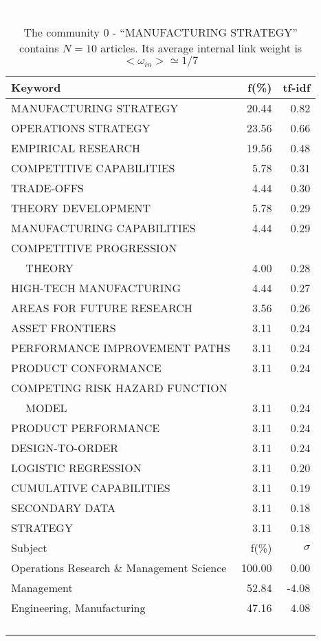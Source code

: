 \documentclass[a4paper,11pt]{report}
\begin{document}
\begin{landscape}
\begin{table}[!ht]
\caption{The community 0 - ``MANUFACTURING STRATEGY'' contains $N = 10$ articles. Its average internal link weight is $<\omega_{in}> \simeq 1/7$ }
\textcolor{white}{aa}\\
{\scriptsize\begin{tabular}{|l r  r|}
\hline
Keyword & f(\%) & tf-idf \\
\hline
MANUFACTURING STRATEGY & 20.44 & 0.82\\
OPERATIONS STRATEGY & 23.56 & 0.66\\
EMPIRICAL RESEARCH & 19.56 & 0.48\\
COMPETITIVE CAPABILITIES & 5.78 & 0.31\\
TRADE-OFFS & 4.44 & 0.30\\
THEORY DEVELOPMENT & 5.78 & 0.29\\
MANUFACTURING CAPABILITIES & 4.44 & 0.29\\
COMPETITIVE PROGRESSION &  &\\
$\quad$ THEORY & 4.00 & 0.28\\
HIGH-TECH MANUFACTURING & 4.44 & 0.27\\
AREAS FOR FUTURE RESEARCH & 3.56 & 0.26\\
ASSET FRONTIERS & 3.11 & 0.24\\
PERFORMANCE IMPROVEMENT PATHS & 3.11 & 0.24\\
PRODUCT CONFORMANCE & 3.11 & 0.24\\
COMPETING RISK HAZARD FUNCTION &  &\\
$\quad$ MODEL & 3.11 & 0.24\\
PRODUCT PERFORMANCE & 3.11 & 0.24\\
DESIGN-TO-ORDER & 3.11 & 0.24\\
LOGISTIC REGRESSION & 3.11 & 0.20\\
CUMULATIVE CAPABILITIES & 3.11 & 0.19\\
SECONDARY DATA & 3.11 & 0.18\\
STRATEGY & 3.11 & 0.18\\
\hline
\hline
Subject & f(\%) & $\sigma$\\
\hline
Operations Research \& Management Science & 100.00 & 0.00\\
Management & 52.84 & -4.08\\
Engineering, Manufacturing & 47.16 & 4.08\\
 &  & \\
 &  & \\
 &  & \\
 &  & \\

\end{tabular}}
\end{table}
\end{landscape}
\end{document}
